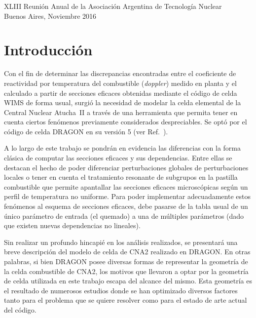 \documentclass[11pt]{article}
\begin{document}
\vfill

\begin{center}
\begin{small}
XLIII Reunión Anual de la Asociación Argentina de Tecnología Nuclear\\
Buenos Aires, Noviembre 2016
\end{small}
\end{center}

\addtolength{\textheight}{-2cm}

\pagebreak

\section{Introducción}

Con el fin de determinar las discrepancias encontradas entre el coeficiente de reactividad por temperatura del combustible (\emph{doppler}) medido en planta y el calculado a partir de secciones eficaces obtenidas mediante el código de celda WIMS de forma usual, surgió la necesidad de modelar la celda elemental de la Central Nuclear Atucha~II a través de una herramienta que permita tener en cuenta ciertos fenómenos previamente considerados despreciables. Se optó por el código de celda DRAGON en su versión 5 (ver Ref.~\cite{handbook-dragon}).

A lo largo de este trabajo se pondrán en evidencia las diferencias con la forma clásica de computar las secciones eficaces y sus dependencias. Entre ellas se destacan el hecho de poder diferenciar perturbaciones globales de perturbaciones locales o tener en cuenta el tratamiento resonante de subgrupos en la pastilla combustible que permite apantallar las secciones eficaces microscópicas según un perfil de temperatura no uniforme. Para poder implementar adecuadamente estos fenómenos al esquema de secciones eficaces, debe pasarse de la tabla usual de un único parámetro de entrada (el quemado) a una de múltiples parámetros (dado que existen nuevas dependencias no lineales).

Sin realizar un profundo hincapié en los análisis realizados, se presentará una breve descripción del modelo de celda de CNA2 realizado en DRAGON. En otras palabras, si bien DRAGON posee diversas formas de representar la geometría de la celda combustible de CNA2, los motivos que llevaron a optar por la geometría de celda utilizada en este trabajo escapa del alcance del mismo. Esta geometría es el resultado de numerosos estudios donde se han optimizado diversos factores tanto para el problema que se quiere resolver como para el estado de arte actual del código.
\end{document}
